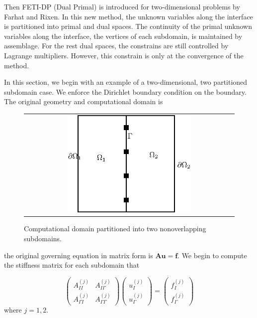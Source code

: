 Then FETI-DP (Dual Primal) is introduced for two-dimensional problems by Farhat and Rixen\cite{farhat2001feti}. In this new method, the unknown variables along the interface is partitioned into primal and dual spaces. The continuity of the primal unknown variables along the interface, the vertices of each subdomain, is maintained by assemblage. For the rest dual spaces, the constrains are still controlled by Lagrange multipliers. However, this constrain is only at the convergence of the method.

In this section, we begin with an example of a two-dimensional, two partitioned subdomain case. We enforce the Dirichlet boundary condition on the boundary. The original geometry and computational domain is  

\begin{figure}[h]
	\centering
	\begin{tabular}{c}
		\includegraphics[width=0.6\textwidth]{./pics/feti1}
	\end{tabular}
	\caption{\footnotesize Computational domain partitioned into two nonoverlapping subdomains.}\label{fig4: feti1}
\end{figure}

the original governing equation in matrix form is $ \mathbf{A} \mathbf{u} = \mathbf{f} $. We begin to compute the stiffness matrix for each subdomain that

\begin{equation}
 \begin{pmatrix}
A_{II}^{(j)} & A_{I\Gamma}^{(j)} \\
A_{\Gamma I}^{(j)} & A_{\Gamma \Gamma}^{(j)}
\end{pmatrix} \begin{pmatrix}
u_{I}^{(j)} \\ u_{\Gamma}^{(j)}
\end{pmatrix} = \begin{pmatrix}
f_{I}^{(j)} \\ f_{\Gamma}^{(j)}
\end{pmatrix}
\end{equation}
where $ j = 1, 2 $.


